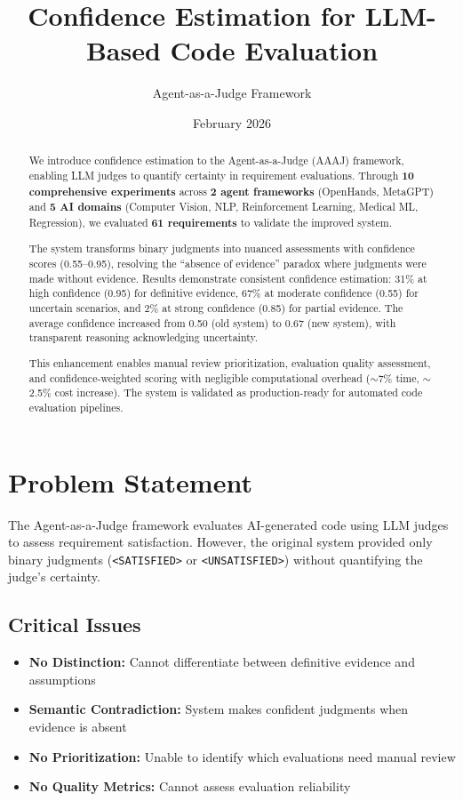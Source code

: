 \documentclass[11pt,a4paper]{article}
\title{\textbf{Confidence Estimation for LLM-Based Code Evaluation}}
\author{Agent-as-a-Judge Framework}
\date{February 2026}
\begin{document}
\maketitle

\begin{abstract}
We introduce confidence estimation to the Agent-as-a-Judge (AAAJ) framework, enabling LLM judges to quantify certainty in requirement evaluations. Through \textbf{10 comprehensive experiments} across \textbf{2 agent frameworks} (OpenHands, MetaGPT) and \textbf{5 AI domains} (Computer Vision, NLP, Reinforcement Learning, Medical ML, Regression), we evaluated \textbf{61 requirements} to validate the improved system.

The system transforms binary judgments into nuanced assessments with confidence scores (0.55--0.95), resolving the ``absence of evidence'' paradox where judgments were made without evidence. Results demonstrate consistent confidence estimation: 31\% at high confidence (0.95) for definitive evidence, 67\% at moderate confidence (0.55) for uncertain scenarios, and 2\% at strong confidence (0.85) for partial evidence. The average confidence increased from 0.50 (old system) to 0.67 (new system), with transparent reasoning acknowledging uncertainty.

This enhancement enables manual review prioritization, evaluation quality assessment, and confidence-weighted scoring with negligible computational overhead ($\sim$7\% time, $\sim$2.5\% cost increase). The system is validated as production-ready for automated code evaluation pipelines.
\end{abstract}

\tableofcontents
\newpage

\section{Problem Statement}

The Agent-as-a-Judge framework evaluates AI-generated code using LLM judges to assess requirement satisfaction. However, the original system provided only binary judgments (\texttt{<SATISFIED>} or \texttt{<UNSATISFIED>}) without quantifying the judge's certainty.

\subsection{Critical Issues}

\begin{itemize}[leftmargin=*]
    \item \textbf{No Distinction:} Cannot differentiate between definitive evidence and assumptions
    \item \textbf{Semantic Contradiction:} System makes confident judgments when evidence is absent
    \item \textbf{No Prioritization:} Unable to identify which evaluations need manual review
    \item \textbf{No Quality Metrics:} Cannot assess evaluation reliability
\end{itemize}
\end{document}

